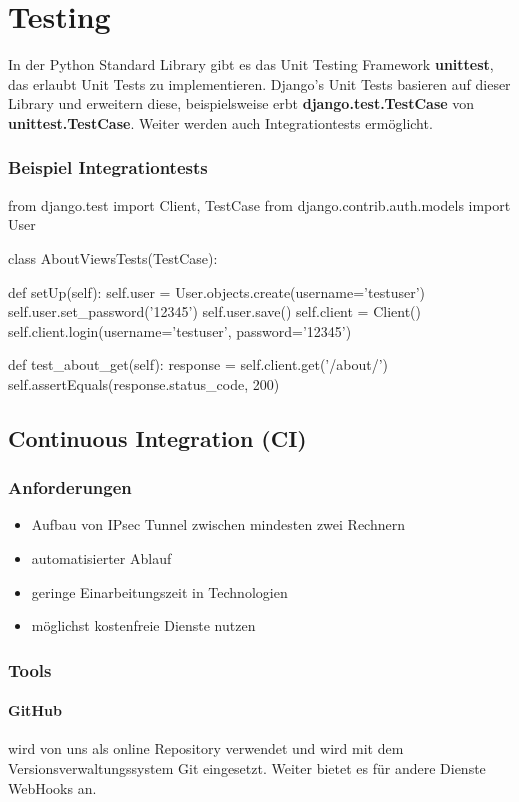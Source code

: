\section{Testing}
In der Python Standard Library gibt es das Unit Testing Framework \textbf{unittest}, das erlaubt Unit Tests zu implementieren. 
Django's Unit Tests basieren auf dieser Library und erweitern diese, beispielsweise erbt \textbf{django.test.TestCase} von \textbf{unittest.TestCase}. Weiter werden auch Integrationtests ermöglicht.

\subsubsection{Beispiel Integrationtests}
\begin{python}
from django.test import Client, TestCase
from django.contrib.auth.models import User

class AboutViewsTests(TestCase):

   def setUp(self):
       self.user = User.objects.create(username='testuser')
       self.user.set_password('12345')
       self.user.save()
       self.client = Client()
       self.client.login(username='testuser', password='12345')

   def test_about_get(self):
       response = self.client.get('/about/')
       self.assertEquals(response.status_code, 200)      
\end{python}

\subsection{Continuous Integration (CI)}
\subsubsection{Anforderungen}
\begin{itemize}
	\item Aufbau von IPsec Tunnel zwischen mindesten zwei Rechnern
	\item automatisierter Ablauf
	\item geringe Einarbeitungszeit in Technologien
	\item möglichst kostenfreie Dienste nutzen
\end{itemize}
\subsubsection{Tools}
\paragraph{GitHub} wird von uns als online Repository verwendet und wird mit dem Versionsverwaltungssystem Git eingesetzt. Weiter bietet es für andere Dienste WebHooks an. 
